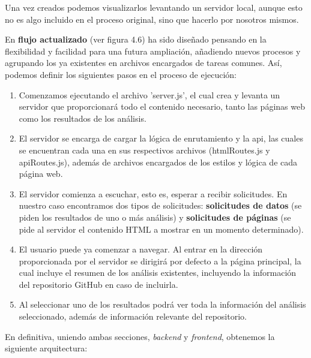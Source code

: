 \documentclass[a4paper, 12pt]{book}
\begin{document}
Una vez creados podemos visualizarlos levantando un servidor local, aunque esto no es algo incluido en el proceso original, sino que hacerlo por nosotros mismos.

En \textbf{flujo actualizado} (ver figura 4.6) ha sido diseñado pensando en la flexibilidad y facilidad para una futura ampliación, añadiendo nuevos procesos y agrupando los ya existentes en archivos encargados de tareas comunes. Así, podemos definir los siguientes pasos en el proceso de ejecución:

\begin{enumerate}
    \item  Comenzamos ejecutando el archivo 'server.js', el cual crea y levanta un servidor que proporcionará todo el contenido necesario, tanto las páginas web como los resultados de los análisis. 
    
    \item El servidor se encarga de cargar la lógica de enrutamiento y la api, las cuales se encuentran cada una en sus respectivos archivos (htmlRoutes.js y apiRoutes.js), además de archivos encargados de los estilos y lógica de cada página web.

    \item El servidor comienza a escuchar, esto es, esperar a recibir solicitudes. En nuestro caso encontramos dos tipos de solicitudes: \textbf{solicitudes de datos} (se piden los resultados de uno o más análisis) y \textbf {solicitudes de páginas} (se pide al servidor el contenido HTML a mostrar en un momento determinado).

    \item El usuario puede ya comenzar a navegar. Al entrar en la dirección proporcionada por el servidor se dirigirá por defecto a la página principal, la cual incluye el resumen de los análisis existentes, incluyendo la información del repositorio GitHub en caso de incluirla.

    \item Al seleccionar uno de los resultados podrá ver toda la información del análisis seleccionado, además de información relevante del repositorio.
    
\end{enumerate}

En definitiva, uniendo ambas secciones, \textit{backend} y \textit{frontend}, obtenemos la siguiente arquitectura:
\end{document}
